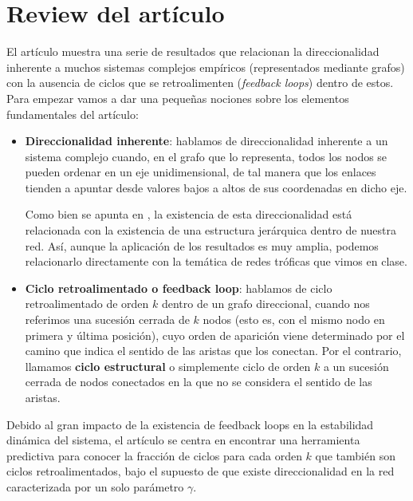 \documentclass[1p]{elsarticle}
\begin{document}
\section{Review del artículo}
El artículo muestra una serie de resultados que relacionan la direccionalidad inherente a muchos sistemas complejos empíricos (representados mediante grafos) con la ausencia de ciclos que se retroalimenten (\textit{feedback loops}) dentro de estos. 
Para empezar vamos a dar una pequeñas nociones sobre los elementos fundamentales del artículo:
\begin{itemize}
	\item \textbf{Direccionalidad inherente}: hablamos de direccionalidad inherente a un sistema complejo cuando, en el grafo que lo representa, todos los nodos se pueden ordenar en un eje unidimensional, de tal manera que los enlaces tienden a apuntar desde valores bajos a altos de sus coordenadas en dicho eje. 
	
	Como bien se apunta en \cite{arti}, la existencia de esta direccionalidad está relacionada con la existencia de una estructura jerárquica dentro de nuestra red. Así, aunque la aplicación de los resultados es muy amplia, podemos relacionarlo directamente con la temática de redes tróficas que vimos en clase. 

	\item \textbf{Ciclo retroalimentado o feedback loop}: hablamos de ciclo retroalimentado de orden $k$ dentro de un grafo direccional, cuando nos referimos una sucesión cerrada de $k$ nodos (esto es, con el mismo nodo en primera y última posición), cuyo orden de aparición viene determinado por el camino que indica el sentido de las aristas que los conectan.
        Por el contrario, llamamos \textbf{ciclo estructural} o simplemente ciclo de orden $k$ a un sucesión cerrada de nodos conectados en la que no se considera el sentido de las aristas.
\end{itemize}


    Debido al gran impacto de la existencia de feedback loops en la estabilidad dinámica del sistema, el artículo se centra en encontrar una herramienta predictiva para conocer  la fracción de ciclos para cada orden $k$ que también son ciclos retroalimentados, bajo el supuesto de que existe direccionalidad en la red caracterizada por un solo parámetro $\gamma$. 
\end{document}
